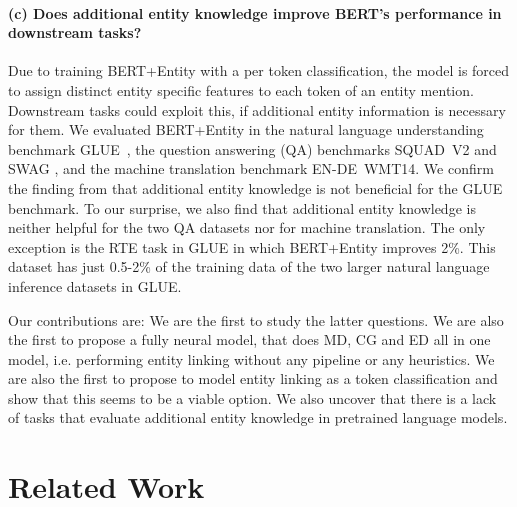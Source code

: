 \documentclass[11pt,a4paper]{article}
\begin{document}
\paragraph{(c) Does additional entity knowledge improve BERT's performance in downstream tasks?}
Due to training BERT+Entity with a per token classification, the model is forced to assign distinct entity specific features to each token of an entity mention. Downstream tasks could exploit this, if additional entity information is necessary for them. We evaluated BERT+Entity in the natural language understanding benchmark GLUE~\citep{DBLP:conf/emnlp/WangSMHLB18/GLUE}, the question answering (QA) benchmarks SQUAD~V2 \citep{DBLP:conf/acl/RajpurkarJL18/SQUADV2} and SWAG \citep{DBLP:conf/emnlp/ZellersBSC18/SWAG}, and the machine translation benchmark EN-DE~WMT14. We confirm the finding from  \citet{DBLP:journals/corr/abs-1905-07129/ernie} that additional entity knowledge is not beneficial for the GLUE benchmark. To our surprise, we also find that additional entity knowledge is neither helpful for the two QA datasets nor for machine translation. The only exception is the RTE task in GLUE in which BERT+Entity improves 2\%. This dataset has just 0.5-2\% of the training data of the two larger natural language inference datasets in GLUE.    

Our contributions are: We are the first to study the latter questions. We are also the first to propose a fully neural model, that does MD, CG and ED all in one model, i.e. performing entity linking without any pipeline or any heuristics. We are also the first to propose to model entity linking as a token classification and show that this seems to be a viable option. We also uncover that there is a lack of tasks that evaluate additional entity knowledge in pretrained language models.


\section{Related Work}
\end{document}
